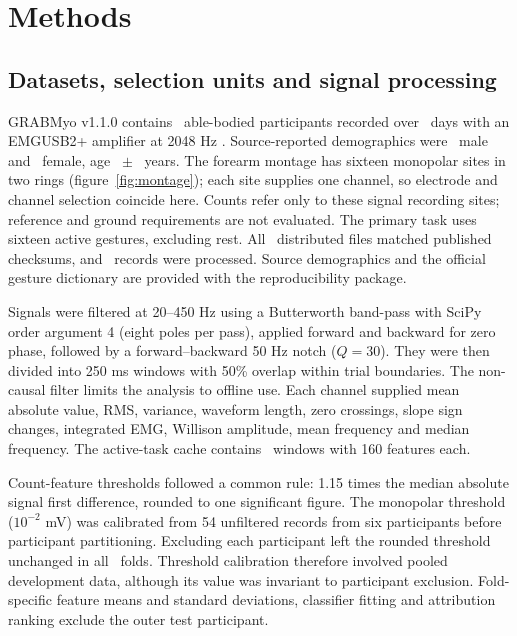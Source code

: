 \section{Methods}
\subsection{Datasets, selection units and signal processing}
GRABMyo v1.1.0 contains \GRABMyoParticipants\ able-bodied participants recorded over \GRABMyoSessions\ days with an EMGUSB2+ amplifier at 2048 Hz \citep{pradhan2022multiday,jiang2024grabmyo}. Source-reported demographics were \GRABMyoMale\ male and \GRABMyoFemale\ female, age \GRABMyoAgeMean\ $\pm$ \GRABMyoAgeSD\ years. The forearm montage has sixteen monopolar sites in two rings (figure~\ref{fig:montage}); each site supplies one channel, so electrode and channel selection coincide here. Counts refer only to these signal recording sites; reference and ground requirements are not evaluated. The primary task uses sixteen active gestures, excluding rest. All \GRABMyoFilesVerified\ distributed files matched published checksums, and \GRABMyoRecords\ records were processed. Source demographics and the official gesture dictionary are provided with the reproducibility package.

Signals were filtered at 20--450 Hz using a Butterworth band-pass with SciPy order argument 4 (eight poles per pass), applied forward and backward for zero phase, followed by a forward--backward 50 Hz notch ($Q=30$). They were then divided into 250 ms windows with 50\% overlap within trial boundaries. The non-causal filter limits the analysis to offline use. Each channel supplied mean absolute value, RMS, variance, waveform length, zero crossings, slope sign changes, integrated EMG, Willison amplitude, mean frequency and median frequency. The active-task cache contains \GRABMyoActiveWindows\ windows with 160 features each.

Count-feature thresholds followed a common rule: 1.15 times the median absolute signal first difference, rounded to one significant figure. The monopolar threshold ($10^{-2}$ mV) was calibrated from 54 unfiltered records from six participants before participant partitioning. Excluding each participant left the rounded threshold unchanged in all \LOOMonoFolds\ folds. Threshold calibration therefore involved pooled development data, although its value was invariant to participant exclusion. Fold-specific feature means and standard deviations, classifier fitting and attribution ranking exclude the outer test participant.


